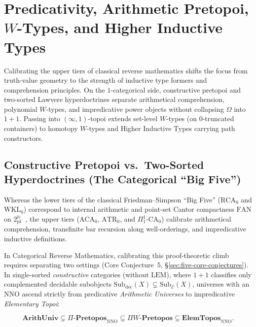 \section{Predicativity, Arithmetic Pretopoi, $W$-Types, and Higher Inductive Types}\label{sec:predicativity-wtypes}

Calibrating the upper tiers of classical reverse mathematics shifts the focus from truth-value geometry to the strength of inductive type formers and comprehension principles. On the $1$-categorical side, constructive pretopoi and two-sorted Lawvere hyperdoctrines separate arithmetical comprehension, polynomial $W$-types, and impredicative power objects without collapsing $\Omega$ into $1 + 1$. Passing into $(\infty, 1)$-topoi extends set-level $W$-types (on $0$-truncated containers) to homotopy $W$-types and Higher Inductive Types carrying path constructors.

\subsection{Constructive Pretopoi vs.\ Two-Sorted Hyperdoctrines (The Categorical ``Big Five'')}

Whereas the lower tiers of the classical Friedman--Simpson ``Big Five'' ($\mathrm{RCA}_0$ and $\mathrm{WKL}_0$) correspond to internal arithmetic and point-set Cantor compactness $\mathrm{FAN}$ on $2^{\mathbb{N}}_{\mathrm{pt}}$~\cite{Simpson09}, the upper tiers ($\mathrm{ACA}_0$, $\mathrm{ATR}_0$, and $\Pi^1_1\text{-}\mathrm{CA}_0$) calibrate arithmetical comprehension, transfinite bar recursion along well-orderings, and impredicative inductive definitions.

In Categorical Reverse Mathematics, calibrating this proof-theoretic climb requires separating two settings (Core Conjecture~5, \S\ref{sec:five-core-conjectures}). In single-sorted \emph{constructive} categories (without $\mathrm{LEM}$), where $1 + 1$ classifies only complemented decidable subobjects $\mathrm{Sub}_{\mathrm{dec}}(X) \subsetneq \mathrm{Sub}_{\mathcal{E}}(X)$, universes with an $\mathrm{NNO}$ ascend strictly from predicative \emph{Arithmetic Universes} to impredicative \emph{Elementary Topoi}:

\[
  \mathbf{ArithUniv} \subsetneq \Pi\text{-}\mathbf{Pretopos}_{\mathrm{NNO}} \subsetneq \Pi W\text{-}\mathbf{Pretopos} \subsetneq \mathbf{ElemTopos}_{\mathrm{NNO}}.
\]

